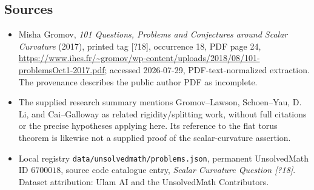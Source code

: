 \documentclass[11pt]{article}
\begin{document}
\subsection{Sources}
\begin{itemize}
\item Misha Gromov, \emph{101 Questions, Problems and Conjectures around Scalar Curvature} (2017), printed tag [?18], occurrence 18, PDF page 24, \url{https://www.ihes.fr/~gromov/wp-content/uploads/2018/08/101-problemsOct1-2017.pdf}; accessed 2026-07-29, PDF-text-normalized extraction. The provenance describes the public author PDF as incomplete.
\item The supplied research summary mentions Gromov--Lawson, Schoen--Yau, D. Li, and Cai--Galloway as related rigidity/splitting work, without full citations or the precise hypotheses applying here. Its reference to the flat torus theorem is likewise not a supplied proof of the scalar-curvature assertion.
\item Local registry \texttt{data/unsolvedmath/problems.json}, permanent UnsolvedMath ID $6700018$, source code catalogue entry, \emph{Scalar Curvature Question [?18]}. Dataset attribution: Ulam AI and the UnsolvedMath Contributors.
\end{itemize}
\end{document}
